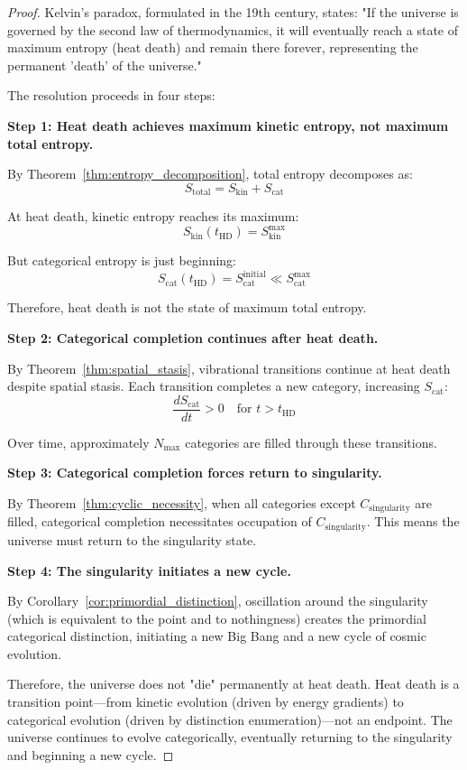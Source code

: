 \documentclass[12pt,a4paper]{article}
\theoremstyle{definition}
\theoremstyle{remark}
\newcommand{\Nmax}{N_{\text{max}}}
\begin{document}
\begin{proof}
Kelvin's paradox, formulated in the 19th century, states: "If the universe is governed by the second law of thermodynamics, it will eventually reach a state of maximum entropy (heat death) and remain there forever, representing the permanent 'death' of the universe."

The resolution proceeds in four steps:

\textbf{Step 1: Heat death achieves maximum kinetic entropy, not maximum total entropy.}

By Theorem~\ref{thm:entropy_decomposition}, total entropy decomposes as:
\begin{equation}
S_{\text{total}} = S_{\text{kin}} + S_{\text{cat}}
\end{equation}

At heat death, kinetic entropy reaches its maximum:
\begin{equation}
S_{\text{kin}}(t_{\text{HD}}) = S_{\text{kin}}^{\max}
\end{equation}

But categorical entropy is just beginning:
\begin{equation}
S_{\text{cat}}(t_{\text{HD}}) = S_{\text{cat}}^{\text{initial}} \ll S_{\text{cat}}^{\max}
\end{equation}

Therefore, heat death is not the state of maximum total entropy.

\textbf{Step 2: Categorical completion continues after heat death.}

By Theorem~\ref{thm:spatial_stasis}, vibrational transitions continue at heat death despite spatial stasis. Each transition completes a new category, increasing $S_{\text{cat}}$:
\begin{equation}
\frac{dS_{\text{cat}}}{dt} > 0 \quad \text{for } t > t_{\text{HD}}
\end{equation}

Over time, approximately $\Nmax$ categories are filled through these transitions.

\textbf{Step 3: Categorical completion forces return to singularity.}

By Theorem~\ref{thm:cyclic_necessity}, when all categories except $C_{\text{singularity}}$ are filled, categorical completion necessitates occupation of $C_{\text{singularity}}$. This means the universe must return to the singularity state.

\textbf{Step 4: The singularity initiates a new cycle.}

By Corollary~\ref{cor:primordial_distinction}, oscillation around the singularity (which is equivalent to the point and to nothingness) creates the primordial categorical distinction, initiating a new Big Bang and a new cycle of cosmic evolution.

Therefore, the universe does not "die" permanently at heat death. Heat death is a transition point—from kinetic evolution (driven by energy gradients) to categorical evolution (driven by distinction enumeration)—not an endpoint. The universe continues to evolve categorically, eventually returning to the singularity and beginning a new cycle.
\end{proof}
\end{document}
